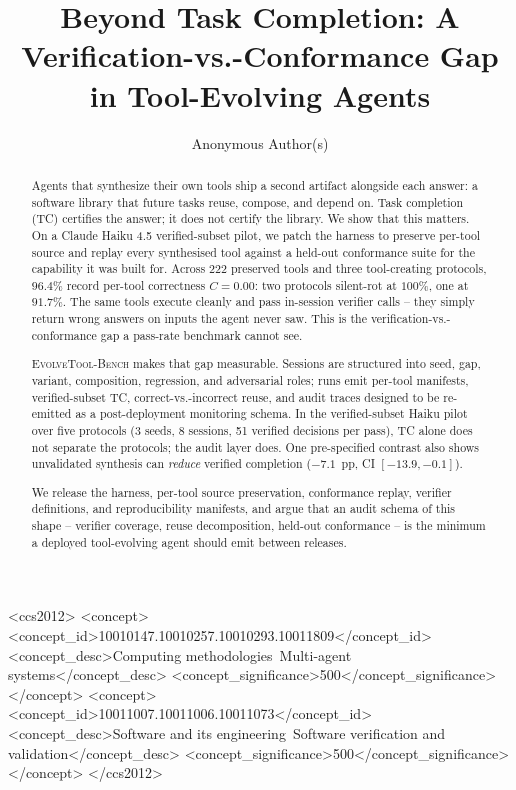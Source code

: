 \documentclass[sigconf,anonymous,review,natbib=false]{acmart}
\begin{document}
\title{Beyond Task Completion: A Verification-vs.-Conformance Gap in Tool-Evolving Agents}

\author{Anonymous Author(s)}

\begin{abstract}
Agents that synthesize their own tools ship a second artifact alongside each answer: a software library that future tasks reuse, compose, and depend on. Task completion (TC) certifies the answer; it does not certify the library. We show that this matters. On a Claude Haiku 4.5 verified-subset pilot, we patch the harness to preserve per-tool source and replay every synthesised tool against a held-out conformance suite for the capability it was built for. Across 222 preserved tools and three tool-creating protocols, $96.4\%$ record per-tool correctness $C{=}0.00$: two protocols silent-rot at $100\%$, one at $91.7\%$. The same tools execute cleanly and pass in-session verifier calls -- they simply return wrong answers on inputs the agent never saw. This is the verification-vs.-conformance gap a pass-rate benchmark cannot see.

\textsc{EvolveTool-Bench} makes that gap measurable. Sessions are structured into seed, gap, variant, composition, regression, and adversarial roles; runs emit per-tool manifests, verified-subset TC, correct-vs.-incorrect reuse, and audit traces designed to be re-emitted as a post-deployment monitoring schema. In the verified-subset Haiku pilot over five protocols (3 seeds, 8 sessions, 51 verified decisions per pass), TC alone does not separate the protocols; the audit layer does. One pre-specified contrast also shows unvalidated synthesis can \emph{reduce} verified completion ($-7.1$~pp, CI $[-13.9,-0.1]$).

We release the harness, per-tool source preservation, conformance replay, verifier definitions, and reproducibility manifests, and argue that an audit schema of this shape -- verifier coverage, reuse decomposition, held-out conformance -- is the minimum a deployed tool-evolving agent should emit between releases.
\end{abstract}


\begin{CCSXML}
<ccs2012>
 <concept>
  <concept_id>10010147.10010257.10010293.10011809</concept_id>
  <concept_desc>Computing methodologies~Multi-agent systems</concept_desc>
  <concept_significance>500</concept_significance>
 </concept>
 <concept>
  <concept_id>10011007.10011006.10011073</concept_id>
  <concept_desc>Software and its engineering~Software verification and validation</concept_desc>
  <concept_significance>500</concept_significance>
 </concept>
</ccs2012>
\end{CCSXML}
\end{document}
